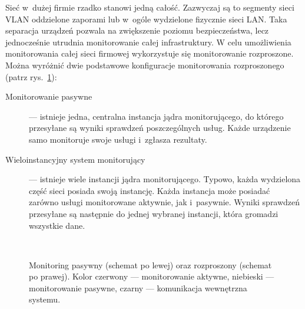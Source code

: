 Sieć w~dużej firmie rzadko stanowi jedną całość. Zazwyczaj są to
segmenty sieci VLAN oddzielone zaporami lub w~ogóle wydzielone
fizycznie sieci LAN. Taka separacja urządzeń pozwala na zwiększenie
poziomu bezpieczeństwa, lecz jednocześnie utrudnia monitorowanie całej
infrastruktury. W celu umożliwienia monitorowania całej sieci firmowej
wykorzystuje się monitorowanie rozproszone. Można wyróżnić dwie
podstawowe konfiguracje monitorowania rozproszonego (patrz
rys.~\ref{fig:PorPasIRozp}):

\begin{description}
\item[Monitorowanie pasywne] --- istnieje jedna, centralna instancja jądra
  monitorującego, do którego przesyłane są wyniki sprawdzeń
  poszczególnych usług. Każde urządzenie samo monitoruje swoje usługi
  i~zgłasza rezultaty.
\item[Wieloinstancyjny system monitorujący] --- istnieje wiele instancji
  jądra monitorującego. Typowo, każda wydzielona część sieci posiada
  swoją instancję. Każda instancja może posiadać zarówno usługi
  monitorowane aktywnie, jak i~pasywnie. Wyniki sprawdzeń przesyłane są
  następnie do jednej wybranej instancji, która gromadzi wszystkie
  dane.
\end{description}

\begin{figure}[ht]
  \caption{Monitoring pasywny (schemat po lewej) oraz rozproszony
    (schemat po prawej). Kolor czerwony --- monitorowanie aktywne,
    niebieski --- monitorowanie pasywne, czarny --- komunikacja wewnętrzna
    systemu.}
  \label{fig:PorPasIRozp}
\\[0.1cm]
\end{figure}

